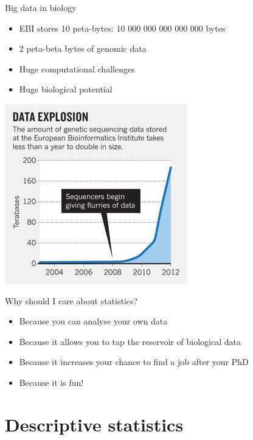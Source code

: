 \documentclass{beamer}\usepackage[]{graphicx}\usepackage[]{color}
\begin{document}
\begin{frame}{Big data in biology}
  \begin{itemize}
    \item EBI stores 10 peta-bytes: 10 000 000 000 000 000 bytes
    \item 2 peta-beta bytes of genomic data
    \item {\color{red} Huge computational challenges}
    \item {\color{green} Huge biological potential}
  \end{itemize}
  \begin{center}
    \includegraphics[width=.5\linewidth]{data_ebi.jpg}
  \end{center}
\end{frame}

\begin{frame}{Why should I care about statistics?}
  \begin{itemize}
    \item Because you can analyse your own data
    \item Because it allows you to tap the reservoir of biological data
    \item Because it increases your chance to find a job after your PhD
    \item Because it is fun!
  \end{itemize}
\end{frame}

\section{Descriptive statistics}
\begin{frame}
\tableofcontents[currentsection]
\end{frame}
\end{document}
